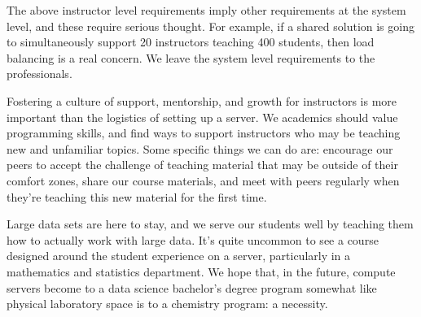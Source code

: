 \documentclass[12pt]{article}
\begin{document}
The above instructor level requirements imply other requirements at the system level, and these require serious thought.
For example, if a shared solution is going to simultaneously support 20 instructors teaching 400 students, then load balancing is a real concern.
We leave the system level requirements to the professionals.

Fostering a culture of support, mentorship, and growth for instructors is more important than the logistics of setting up a server.
We academics should value programming skills, and find ways to support instructors who may be teaching new and unfamiliar topics.
Some specific things we can do are: encourage our peers to accept the challenge of teaching material that may be outside of their comfort zones, share our course materials, and meet with peers regularly when they're teaching this new material for the first time.

Large data sets are here to stay, and we serve our students well by teaching them how to actually work with large data.
It's quite uncommon to see a course designed around the student experience on a server, particularly in a mathematics and statistics department.
We hope that, in the future, compute servers become to a data science bachelor's degree program somewhat like physical laboratory space is to a chemistry program: a necessity.




\end{document}
